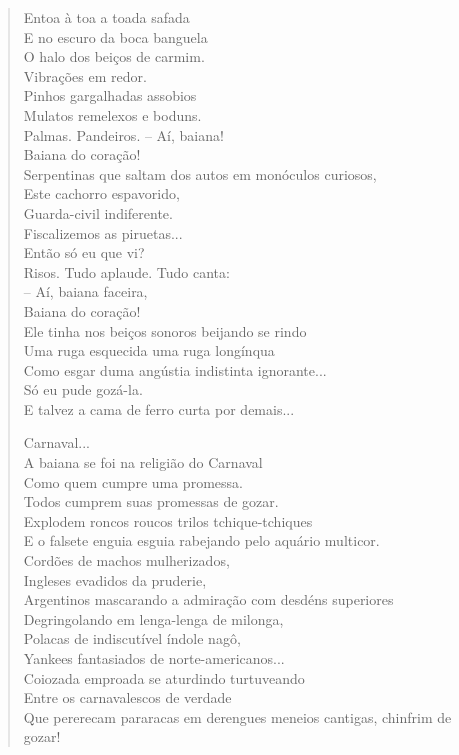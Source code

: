 \begin{verse}
Entoa à toa a toada safada\\
E no escuro da boca banguela\\
O halo dos beiços de carmim.\\
Vibrações em redor.\\
Pinhos gargalhadas assobios\\
Mulatos remelexos e boduns.\\
Palmas. Pandeiros. -- Aí, baiana!\\
\quad\quad\quad{}Baiana do coração!\\
Serpentinas que saltam dos autos em monóculos curiosos,\\
Este cachorro espavorido,\\
Guarda-civil indiferente.\\
Fiscalizemos as piruetas...\\
Então só eu que vi?\\
Risos. Tudo aplaude. Tudo canta:\\
\quad\quad{}-- Aí, baiana faceira,\\
\quad\quad{}Baiana do coração!\\
Ele tinha nos beiços sonoros beijando se rindo\\
Uma ruga esquecida uma ruga longínqua\\
Como esgar duma angústia indistinta ignorante...\\
Só eu pude gozá-la.\\
E talvez a cama de ferro curta por demais...

Carnaval...\\
A baiana se foi na religião do Carnaval\\
Como quem cumpre uma promessa.\\
Todos cumprem suas promessas de gozar.\\
Explodem roncos roucos trilos tchique-tchiques\\
E o falsete enguia esguia rabejando pelo aquário multicor.\\
Cordões de machos mulherizados,\\
Ingleses evadidos da pruderie,\\
Argentinos mascarando a admiração com desdéns superiores\\
Degringolando em lenga-lenga de milonga,\\
Polacas de indiscutível índole nagô,\\
Yankees fantasiados de norte-americanos...\\
Coiozada emproada se aturdindo turtuveando\\
Entre os carnavalescos de verdade\\
Que pererecam pararacas em derengues meneios cantigas, chinfrim de gozar!


\end{verse}
